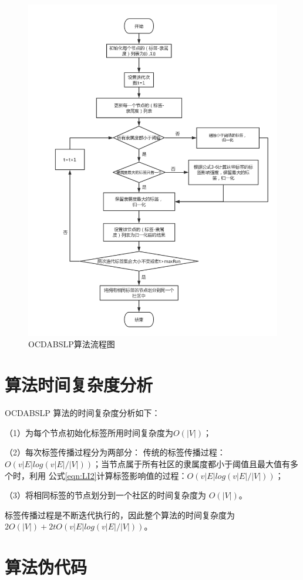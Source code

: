 \begin{figure}
  \centering
  \includegraphics[width=1\textwidth]{figures/fig4-1}
  \caption{OCDABSLP算法流程图}\label{fig:fig4-1}
\end{figure}

\section{算法时间复杂度分析}
OCDABSLP 算法的时间复杂度分析如下： 

（1）为每个节点初始化标签所用时间复杂度为$ O(|V|)$； 

（2）每次标签传播过程分为两部分： 传统的标签传播过程：$O(v|E|log(v|E|/|V|))$；当节点属于所有社区的隶属度都小于阈值且最大值有多个时，利用
公式\ref{eqn:LI2}计算标签影响值的过程：$O(v|E|log(v|E|/|V|))$； 

（3）将相同标签的节点划分到一个社区的时间复杂度为 $O(|V|)$。 

标签传播过程是不断迭代执行的，因此整个算法的时间复杂度为
$2O(|V|)+2tO(v|E|log(v|E|/|V|))$。

\section{算法伪代码}